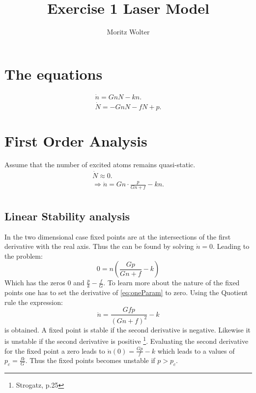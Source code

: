 




\title{Exercise 1 Laser Model}
\author{Moritz Wolter}

\maketitle

\section{The equations}
\begin{eqnarray}
\dot{n} = GnN - kn. \\
\dot{N} = -GnN - fN + p.
\end{eqnarray}


\section{First Order Analysis}
Assume that the number of excited atoms remains quasi-static. 
\begin{eqnarray}
\dot{N} \approx 0. \\
\Rightarrow \dot{n} = Gn \cdot \frac{p}{Gn + f} - kn. \label{eq:oneParam}\\
\end{eqnarray}
\subsection{Linear Stability analysis}
In the two dimensional case fixed points are at the intersections of the first derivative with the real axis. Thus the can be found by solving $\dot{n}=0$. Leading to the problem:
\begin{equation}
0 = n ( \frac{Gp}{Gn+f} - k)
\end{equation}
Which has the zeros $0$ and $\frac{p}{k} - \frac{f}{G}$. To learn more about the nature of the fixed points one has to set the derivative of \ref{eq:oneParam} to zero. Using the Quotient rule the expression: 
\begin{equation}
\ddot{n} = \frac{Gfp}{(Gn+f)^2} - k   
\label{eq:secondDiv} 
\end{equation}
is obtained. A fixed point is stable if the second derivative is negative. Likewise it is unstable if the second derivative is positive \footnote{Strogatz, p.25}.
Evaluating the second derivative for the fixed point a zero leads to $\ddot{n}(0) = \frac{Gp}{f} - k$ which leads to a values of $p_c = \frac{fk}{G}$. Thus the fixed points becomes unstable if $p > p_c$.

